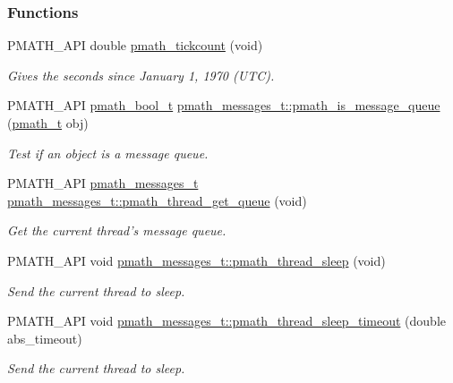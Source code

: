 \subsubsection*{Functions}
\begin{CompactItemize}
\item 
PMATH\_\-API double \hyperlink{group__threadmsg_geff0c8bdc4ab3fb6a0d8abb3ebf07532}{pmath\_\-tickcount} (void)
\begin{CompactList}\small\item\em Gives the seconds since January 1, 1970 (UTC). \item\end{CompactList}\item 
PMATH\_\-API \hyperlink{group__general__types_gc92090cb0b56345d6c379ed2341d4ef4}{pmath\_\-bool\_\-t} \hyperlink{group__threadmsg_g93b45ad8c3063c94602c8bbaaf3c2613}{pmath\_\-messages\_\-t::pmath\_\-is\_\-message\_\-queue} (\hyperlink{classpmath__t}{pmath\_\-t} obj)
\begin{CompactList}\small\item\em Test if an object is a message queue. \item\end{CompactList}\item 
PMATH\_\-API \hyperlink{classpmath__messages__t}{pmath\_\-messages\_\-t} \hyperlink{group__threadmsg_gf4d69db0ffe06846e57df7cadcd3dab6}{pmath\_\-messages\_\-t::pmath\_\-thread\_\-get\_\-queue} (void)
\begin{CompactList}\small\item\em Get the current thread's message queue. \item\end{CompactList}\item 
PMATH\_\-API void \hyperlink{group__threadmsg_gce6da6e34b0aeab35094ddccdd9a3e55}{pmath\_\-messages\_\-t::pmath\_\-thread\_\-sleep} (void)
\begin{CompactList}\small\item\em Send the current thread to sleep. \item\end{CompactList}\item 
PMATH\_\-API void \hyperlink{group__threadmsg_g199f3dc07d4b89174e641fa4b0b757db}{pmath\_\-messages\_\-t::pmath\_\-thread\_\-sleep\_\-timeout} (double abs\_\-timeout)
\begin{CompactList}\small\item\em Send the current thread to sleep. \item\end{CompactList}\item 

\end{CompactItemize}
